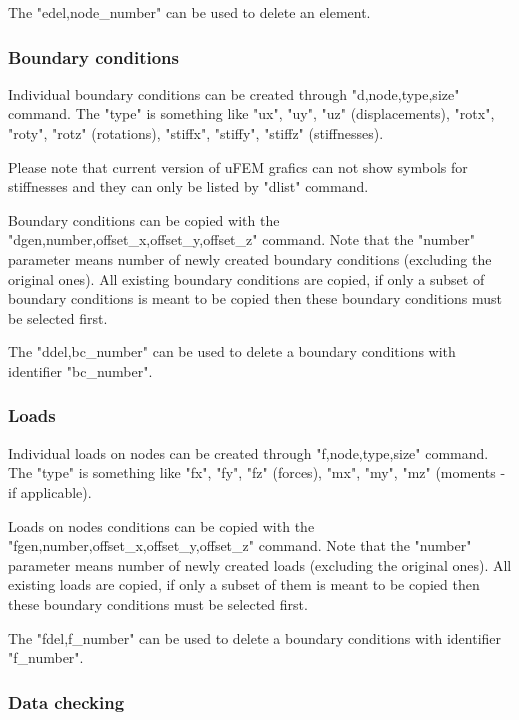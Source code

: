 \documentclass{article}
\begin{document}
 The "edel,node\_number" can be used to delete an element.



\subsubsection{Boundary conditions}

 Individual boundary conditions can be created through "d,node,type,size"
 command. The "type" is something like "ux", "uy", "uz" (displacements),
 "rotx", "roty", "rotz" (rotations), "stiffx", "stiffy", "stiffz" (stiffnesses).

 Please note that current version of uFEM grafics can not show symbols for stiffnesses
 and they can only be listed by "dlist" command.

 Boundary conditions can be copied with the "dgen,number,offset\_x,offset\_y,offset\_z" command.
 Note that the "number" parameter means number of newly created
 boundary conditions (excluding the original ones). All existing boundary conditions
 are copied, if only a subset of boundary conditions is meant to be copied
 then these boundary conditions must be selected first.

 The "ddel,bc\_number" can be used to delete a boundary conditions with identifier "bc\_number".



\subsubsection{Loads}

 Individual loads on nodes can be created through "f,node,type,size"
 command. The "type" is something like "fx", "fy", "fz" (forces),
 "mx", "my", "mz" (moments - if applicable).

 Loads on nodes conditions can be copied with the "fgen,number,offset\_x,offset\_y,offset\_z" command.
 Note that the "number" parameter means number of newly created
 loads (excluding the original ones). All existing loads
 are copied, if only a subset of them is meant to be copied
 then these boundary conditions must be selected first.

 The "fdel,f\_number" can be used to delete a boundary conditions with identifier "f\_number".



\subsubsection{Data checking}
\end{document}

